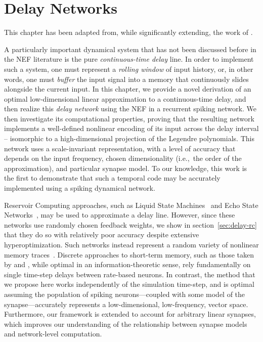 \chapter{Delay Networks}
\label{chapt:delays}

This chapter has been adapted from, while significantly extending, the work of \citet[][patent pending]{voelker2015computing, dynamicspatent, voelker2018}.

A particularly important dynamical system that has not been discussed before in the NEF literature is the pure \emph{continuous-time delay} line.
In order to implement such a system, one must represent a \emph{rolling window} of input history, or, in other words, one must \emph{buffer} the input signal into a memory that continuously slides alongside the current input.
In this chapter, we provide a novel derivation of an optimal low-dimensional linear approximation to a continuous-time delay, and then realize this \emph{delay network} using the NEF in a recurrent spiking network.
We then investigate its computational properties, proving that the resulting network implements a well-defined nonlinear encoding of its input across the delay interval -- isomorphic to a high-dimensional projection of the Legendre polynomials.
This network uses a scale-invariant representation, with a level of accuracy that depends on the input frequency, chosen dimensionality (i.e.,~the order of the approximation), and particular synapse model.
To our knowledge, this work is the first to demonstrate that such a temporal code may be accurately implemented using a spiking dynamical network.

Reservoir Computing approaches, such as Liquid State Machines~\citep{maass2002real} and Echo State Networks~\citep{jaeger2001echo}, may be used to approximate a delay line.
However, since these networks use randomly chosen feedback weights, we show in section~\ref{sec:delay-rc} that they do so with relatively poor accuracy despite extensive hyperoptimization.
Such networks instead represent a random variety of nonlinear memory traces~\citep{lukovsevicius2012reservoir}.
Discrete approaches to short-term memory, such as those taken by \citet{white2004short} and \citet{ganguli2008memory}, while optimal in an information-theoretic sense, rely fundamentally on single time-step delays between rate-based neurons.
In contrast, the method that we propose here works independently of the simulation time-step, and is optimal assuming the population of spiking neurons---coupled with some model of the synapse---accurately represents a low-dimensional, low-frequency, vector space.
Furthermore, our framework is extended to account for arbitrary linear synapses, which improves our understanding of the relationship between synapse models and network-level computation.

